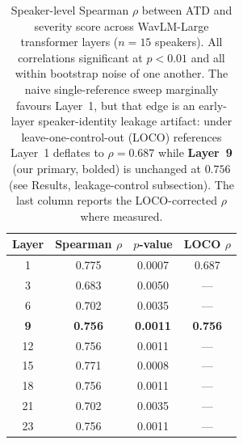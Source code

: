 \begin{table}[t]
\centering
\caption{Speaker-level Spearman $\rho$ between ATD and severity score across
WavLM-Large transformer layers ($n=15$ speakers). All correlations significant
at $p < 0.01$ and all within bootstrap noise of one another. The naive
single-reference sweep marginally favours Layer~1, but that edge is an
early-layer speaker-identity leakage artifact: under leave-one-control-out
(LOCO) references Layer~1 deflates to $\rho = 0.687$ while \textbf{Layer~9}
(our primary, bolded) is unchanged at $0.756$ (see Results, leakage-control
subsection). The last column reports the LOCO-corrected $\rho$ where measured.}
\label{tab:layer_analysis}\label{tab:layers}
\begin{tabular}{cccc}
\toprule
Layer & Spearman $\rho$ & $p$-value & LOCO $\rho$ \\
\midrule
1 & 0.775 & 0.0007 & 0.687 \\
3 & 0.683 & 0.0050 & --- \\
6 & 0.702 & 0.0035 & --- \\
\textbf{9} & \textbf{0.756} & \textbf{0.0011} & \textbf{0.756} \\
12 & 0.756 & 0.0011 & --- \\
15 & 0.771 & 0.0008 & --- \\
18 & 0.756 & 0.0011 & --- \\
21 & 0.702 & 0.0035 & --- \\
23 & 0.756 & 0.0011 & --- \\
\bottomrule
\end{tabular}
\end{table}
